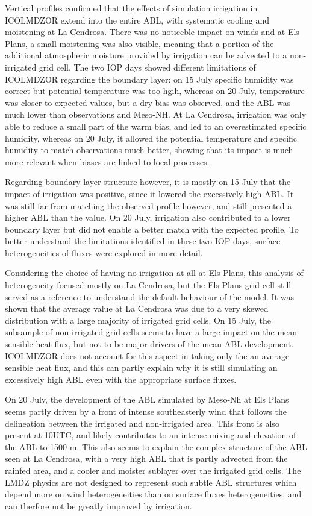 Vertical profiles confirmed that the effects of simulation irrigation in ICOLMDZOR extend into the entire ABL, with systematic cooling and moistening at La Cendrosa. There was no noticeble impact on winds and at Els Plans, a small moistening was also visible, meaning that a portion of the additional atmospheric moisture provided by irrigation can be advected to a non-irrigated grid cell.
The two IOP days showed different limitations of ICOLMDZOR regarding the boundary layer: on 15 July specific humidity was correct but potential temperature was too hgih, whereas on 20 July, temperature was closer to expected values, but a dry bias was observed, and the ABL was much lower than observations and Meso-NH.
At La Cendrosa, \irrboost irrigation was only able to reduce a small part of the warm bias, and led to an overestimated specific humidity, whereas on 20 July, it allowed the potential temperature and specific humidity to match observations much better, showing that its impact is much more relevant when biases are linked to local processes.

Regarding boundary layer structure however, it is mostly on 15 July that the impact of irrigation was positive, since it lowered the excessively high ABL. It was still far from matching the observed profile however, and still presented a higher ABL than the \mesomean value. 
On 20 July, irrigation also contributed to a lower boundary layer but did not enable a better match with the expected profile. 
To better understand the limitations identified in these two IOP days, surface heterogeneities of fluxes were explored in more detail.

\hfill

Considering the choice of having no irrigation at all at Els Plans, this analysis of heterogeneity focused mostly on La Cendrosa, but the Els Plans grid cell still served as a reference to understand the default behaviour of the model.
It was shown that the \mesomean average value at La Cendrosa was due to a very skewed distribution with a large majority of irrigated grid cells. 
On 15 July, the subsample of non-irrigated grid cells seems to have a large impact on the mean sensible heat flux, but not to be major drivers of the mean ABL development. ICOLMDZOR does not account for this aspect in taking only the an average sensible heat flux, and this can partly explain why it is still simulating an excessively high ABL even with the appropriate surface fluxes.

On 20 July, the development of the ABL simulated by Meso-Nh at Els Plans seems partly driven by a front of intense southeasterly wind that follows the delineation between the irrigated and non-irrigated area. This front is also present at 10UTC, and likely contributes to an intense mixing and elevation of the ABL to 1500 m. This also seems to explain the complex structure of the ABL seen at La Cendrosa, with a very high ABL that is partly advected from the rainfed area, and a cooler and moister sublayer over the irrigated grid cells. 
The LMDZ physics are not designed to represent such subtle ABL structures which depend more on wind heterogeneities than on surface fluxes heterogeneities, and can therfore not be greatly improved by irrigation.

